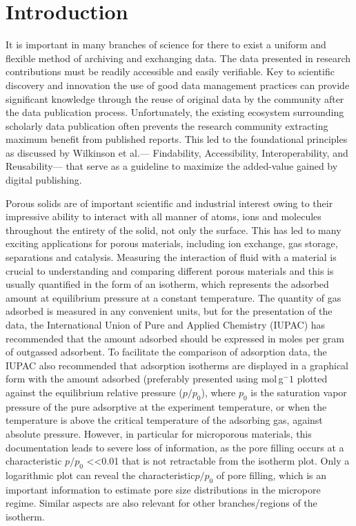 \documentclass[journal=langd5,manuscript=article]{achemso}
\begin{document}
\section{Introduction}
It is important in many branches of science for there to exist a uniform and flexible method of archiving and exchanging data.
The data presented in research contributions must be readily accessible and easily verifiable.
Key to scientific discovery and innovation the use of good data management practices can  provide significant knowledge through the reuse of original data by the community after the data publication process.\cite{10.1002/adts.201900131}
Unfortunately, the existing ecosystem surrounding scholarly data publication often prevents the research community extracting maximum benefit from published reports.
This led to the foundational principles as discussed by Wilkinson et al.--- Findability, Accessibility, Interoperability, and Reusability--- that serve as a guideline to maximize the added-value gained by digital publishing.\cite{10.1038/sdata.2016.18}

Porous solids are of important scientific and industrial interest owing to their impressive ability to interact with all manner of atoms, ions and molecules throughout the entirety of the solid, not only the surface.\cite{10.1038/nature00785}
This has led to many exciting applications for porous materials, including ion exchange, gas storage, separations and catalysis.\cite{10.1039/C6CS00135A}
Measuring the interaction of fluid with a material is crucial to understanding and comparing different porous materials and this is usually quantified in the form of an isotherm, which represents the adsorbed amount at equilibrium pressure at a constant temperature.
The quantity of gas adsorbed is measured in any convenient units, but for the presentation of the data, the International Union of Pure and Applied Chemistry (IUPAC) has recommended that the amount adsorbed should be expressed in moles per gram of outgassed adsorbent.\cite{10.1515/pac-2014-1117}
To facilitate the comparison of adsorption data, the IUPAC also recommended that adsorption isotherms are displayed in a graphical form with the amount adsorbed (preferably presented using mol$\,$g$^-1$ plotted against the equilibrium relative pressure ($p/p_0$), where $p_0$ is the saturation vapor pressure of the pure adsorptive at the experiment temperature, or when the temperature is above the critical temperature of the adsorbing gas, against absolute pressure.
However, in particular for microporous materials, this documentation leads to severe loss of information, as the pore filling occurs at a characteristic $p/p_0$ \textless\textless 0.01 that is not retractable from the isotherm plot.
Only a logarithmic plot can reveal the characteristic$ p/p_0$ of pore filling, which is an important information to estimate pore size distributions in the micropore regime.
Similar aspects are also relevant for other branches/regions of the isotherm. 
\end{document}
